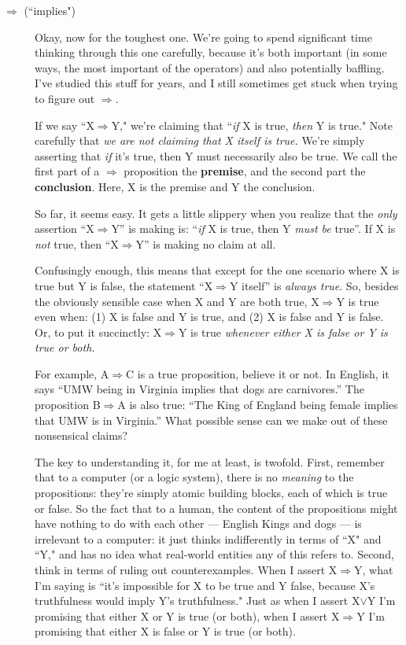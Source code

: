 \begin{description}
\item[$\Rightarrow$ (``implies")] Okay, now for the toughest one. We're
going to spend significant time thinking through this one carefully,
because it's both important (in some ways, the most important of the
operators) and also potentially baffling. I've studied this stuff for
years, and I still sometimes get stuck when trying to figure out
$\Rightarrow$.

If we say ``X$\Rightarrow$Y," we're claiming that ``\textit{if} X is true,
\textit{then} Y is true." Note carefully that \textit{we are not claiming
that X itself is true.} We're simply asserting that \textit{if} it's true,
then Y must necessarily also be true. We call the first part of a
$\Rightarrow$ proposition the \textbf{premise}, and the second part the
\textbf{conclusion}. Here, X is the premise and Y the conclusion.

So far, it seems easy. It gets a little slippery when you realize that the
\textit{only} assertion ``X$\Rightarrow$Y'' is making is: ``\textit{if} X is true,
then Y \textit{must be} true''. If X is \textit{not} true, then
``X$\Rightarrow$Y'' is making no claim at all.

Confusingly enough, this means that except for the one scenario where X is true
but Y is false, the statement ``X$\Rightarrow$Y itself'' is \textit{always
true}. So, besides the obviously sensible case when X and Y are both true,
X$\Rightarrow$Y is true even when: (1) X is false and Y is true, and (2) X is
false and Y is false. Or, to put it succinctly: X$\Rightarrow$Y is true
\textit{whenever either X is false or Y is true or both.}

For example, A$\Rightarrow$C is a true proposition, believe it or not. In
English, it says ``UMW being in Virginia implies that dogs are carnivores.''
The proposition B$\Rightarrow$A is also true: ``The King of England being
female implies that UMW is in Virginia.'' What possible sense can we make out
of these nonsensical claims?

The key to understanding it, for me at least, is twofold. First, remember
that to a computer (or a logic system), there is no \textit{meaning} to the
propositions: they're simply atomic building blocks, each of which is true
or false. So the fact that to a human, the content of the propositions
might have nothing to do with each other --- English Kings and dogs --- is
irrelevant to a computer: it just thinks indifferently in terms of ``X" and
``Y," and has no idea what real-world entities any of this refers to.
Second, think in terms of ruling out counterexamples. When I assert
X$\Rightarrow$Y, what I'm saying is ``it's impossible for X to be true
and Y false, because X's truthfulness would imply Y's truthfulness." Just
as when I assert X$\vee$Y I'm promising that either X or Y is true (or
both), when I assert X$\Rightarrow$Y I'm promising that either X is false
or Y is true (or both).


\end{description}
